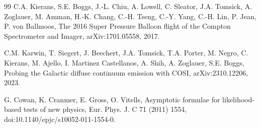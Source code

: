 \documentclass[11pt]{article}
\begin{document}
\begin{thebibliography}{99}
C.A. Kierans, S.E. Boggs, J.-L. Chiu, A. Lowell, C. Sleator, J.A. Tomsick, A. Zoglauer, M. Amman, H.-K. Chang, C.-H. Tseng, C.-Y. Yang, C.-H. Lin, P. Jean, P. von Ballmoos, The 2016 Super Pressure Balloon flight of the Compton Spectrometer and Imager, arXiv:1701.05558, 2017.

C.M. Karwin, T. Siegert, J. Beechert, J.A. Tomsick, T.A. Porter, M. Negro, C. Kierans, M. Ajello, I. Martinez Castellanos, A. Shih, A. Zoglauer, S.E. Boggs, Probing the Galactic diffuse continuum emission with COSI, arXiv:2310.12206, 2023.

G. Cowan, K. Cranmer, E. Gross, O. Vitells, Asymptotic formulae for likelihood-based tests of new physics, Eur. Phys. J. C 71 (2011) 1554, doi:10.1140/epjc/s10052-011-1554-0.

\end{thebibliography}
\end{document}
